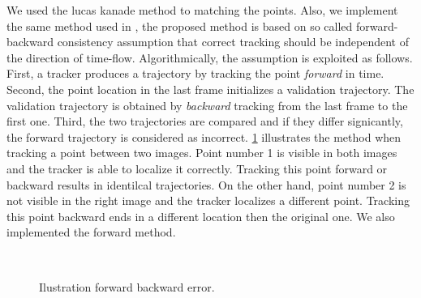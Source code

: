 \documentclass[12pt, a4paper, titlepage,twoside,openright]{article}
\begin{document}
We used the lucas kanade method to matching the points. Also, we implement the same method used in \cite{medianFlow}, the proposed method is based on so called forward-backward consistency assumption that correct tracking should be independent of the direction of time-flow. Algorithmically, the assumption is exploited as follows. First, a tracker produces a trajectory by tracking the point \textit{forward} in time. Second, the point location in the last frame initializes a validation trajectory. The validation trajectory is obtained by \textit{backward} tracking from the last frame to the first one. Third, the two trajectories are compared and if they differ signicantly, the forward trajectory is considered as incorrect. \ref{motion23} illustrates the method when tracking a point between two images. Point number 1 is visible in both images and the tracker is able to localize it correctly. Tracking this point forward or backward results in identilcal trajectories. On the other hand, point number 2 is not visible in the right image and the tracker localizes a different point. Tracking this point backward ends in a different location then the original one. We also implemented the forward method.


%

\begin{figure}[H]
		
\centering

\\
\caption{Ilustration forward backward error.}
\label{motion23}
\end{figure}
\end{document}
